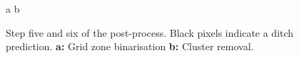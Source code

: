 \documentclass[11pt, review]{elsarticle} %
\begin{document}
\begin{figure} [!htb]
    \centering
    a{
        }\hspace{5pt}
    b{
        }
    \caption{Step five and six of the post-process. Black pixels indicate a ditch prediction. \textbf{a: }Grid zone binarisation \textbf{b: }Cluster removal.}
    \label{fig:postprocessing3}
\end{figure}
\end{document}
